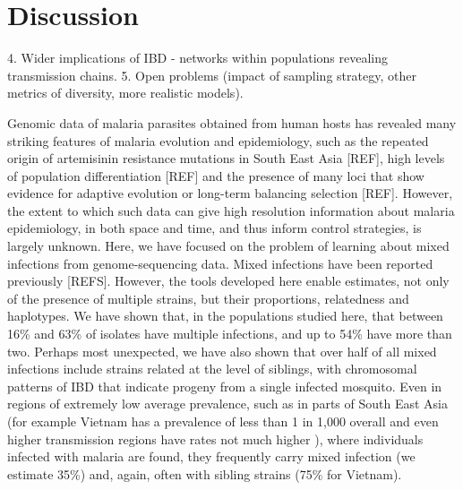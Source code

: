 \documentclass[9pt,lineno]{elife}
\begin{document}
\section{Discussion}

4. Wider implications of IBD - networks within populations revealing transmission chains.
5. Open problems (impact of sampling strategy, other metrics of diversity, more realistic models).


Genomic data of malaria parasites obtained from human hosts has revealed many striking features of malaria evolution and epidemiology, such as the repeated origin of artemisinin resistance mutations in South East Asia [REF], high levels of population differentiation [REF] and the presence of many loci that show evidence for adaptive evolution or long-term balancing selection [REF].  However, the extent to which such data can give high resolution information about malaria epidemiology, in both space and time, and thus inform control strategies, is largely unknown.  Here, we have focused on the problem of learning about mixed infections from genome-sequencing data.  Mixed infections have been reported previously [REFS].  However, the tools developed here enable estimates, not only of the presence of multiple strains, but their proportions, relatedness and haplotypes.  We have shown that, in the populations studied here, that between 16\% and 63\% of isolates have multiple infections, and up to 54\% have more than two.  Perhaps most unexpected, we have also shown that over half of all mixed infections include strains related at the level of siblings, with chromosomal patterns of IBD that indicate progeny from a single infected mosquito.  Even in regions of extremely low average prevalence, such as in parts of South East Asia (for example Vietnam has a prevalence of less than 1 in 1,000 overall and even higher transmission regions have rates not much higher \citep{who2017, who2017profile}), where individuals infected with malaria are found, they frequently carry mixed infection (we estimate 35\%) and, again, often with sibling strains (75\% for Vietnam).
\end{document}
